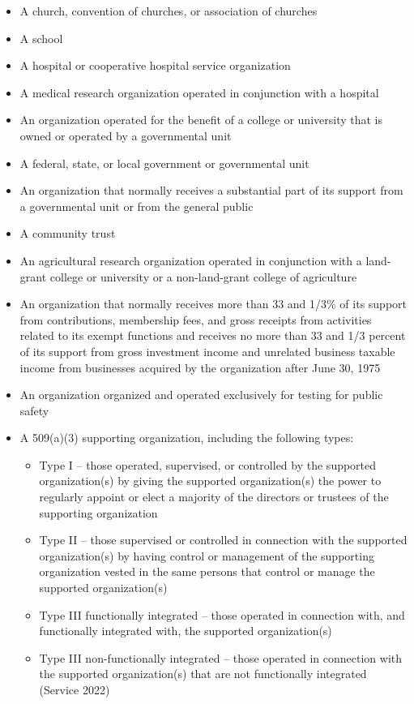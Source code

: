 \documentclass[
  letterpaper,
  DIV=11,
  numbers=noendperiod]{scrreprt}
\begin{document}
\begin{itemize}
\item
  A church, convention of churches, or association of churches
\item
  A school
\item
  A hospital or cooperative hospital service organization
\item
  A medical research organization operated in conjunction with a
  hospital
\item
  An organization operated for the benefit of a college or university
  that is owned or operated by a governmental unit
\item
  A federal, state, or local government or governmental unit
\item
  An organization that normally receives a substantial part of its
  support from a governmental unit or from the general public
\item
  A community trust
\item
  An agricultural research organization operated in conjunction with a
  land-grant college or university or a non-land-grant college of
  agriculture
\item
  An organization that normally receives more than 33 and 1/3\% of its
  support from contributions, membership fees, and gross receipts from
  activities related to its exempt functions and receives no more than
  33 and 1/3 percent of its support from gross investment income and
  unrelated business taxable income from businesses acquired by the
  organization after June 30, 1975
\item
  An organization organized and operated exclusively for testing for
  public safety
\item
  A 509(a)(3) supporting organization, including the following types:

  \begin{itemize}
  \item
    Type I -- those operated, supervised, or controlled by the supported
    organization(s) by giving the supported organization(s) the power to
    regularly appoint or elect a majority of the directors or trustees
    of the supporting organization
  \item
    Type II -- those supervised or controlled in connection with the
    supported organization(s) by having control or management of the
    supporting organization vested in the same persons that control or
    manage the supported organization(s)
  \item
    Type III functionally integrated -- those operated in connection
    with, and functionally integrated with, the supported
    organization(s)
  \item
    Type III non-functionally integrated -- those operated in connection
    with the supported organization(s) that are not functionally
    integrated (Service 2022)
  \end{itemize}
\end{itemize}
\end{document}
